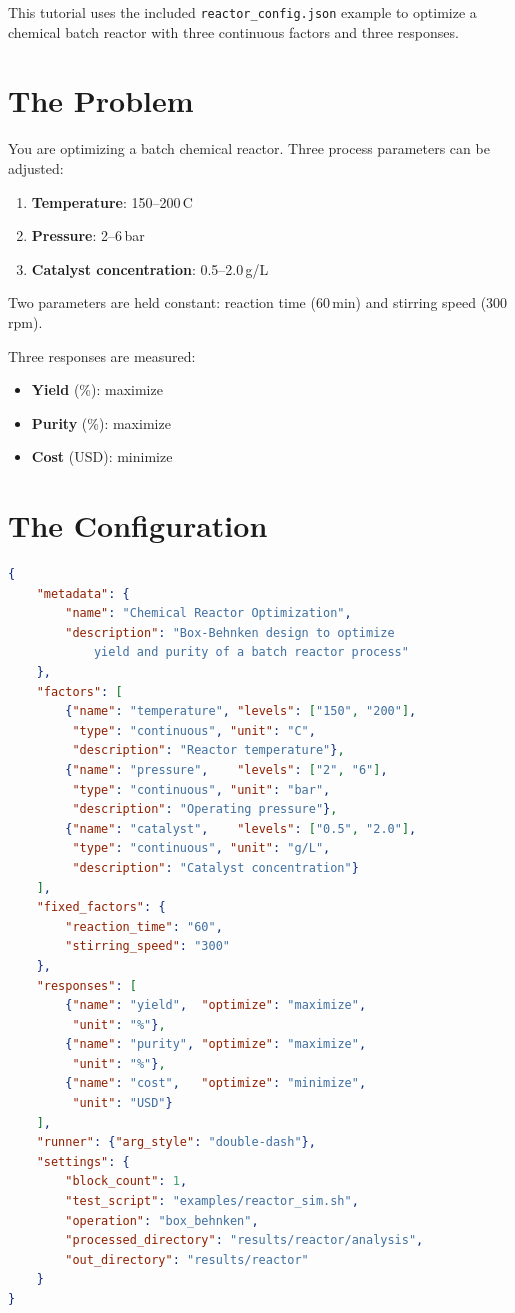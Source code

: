 \documentclass[11pt]{book}
\begin{document}
This tutorial uses the included \texttt{reactor\_config.json} example to optimize a chemical batch reactor with three continuous factors and three responses.

\section{The Problem}

You are optimizing a batch chemical reactor. Three process parameters can be adjusted:

\begin{enumerate}[nosep]
  \item \textbf{Temperature}: 150--200\,\textdegree C
  \item \textbf{Pressure}: 2--6\,bar
  \item \textbf{Catalyst concentration}: 0.5--2.0\,g/L
\end{enumerate}

Two parameters are held constant: reaction time (60\,min) and stirring speed (300\,rpm).

Three responses are measured:
\begin{itemize}[nosep]
  \item \textbf{Yield} (\%): maximize
  \item \textbf{Purity} (\%): maximize
  \item \textbf{Cost} (USD): minimize
\end{itemize}

\section{The Configuration}

\begin{lstlisting}[language=json]
{
    "metadata": {
        "name": "Chemical Reactor Optimization",
        "description": "Box-Behnken design to optimize
            yield and purity of a batch reactor process"
    },
    "factors": [
        {"name": "temperature", "levels": ["150", "200"],
         "type": "continuous", "unit": "C",
         "description": "Reactor temperature"},
        {"name": "pressure",    "levels": ["2", "6"],
         "type": "continuous", "unit": "bar",
         "description": "Operating pressure"},
        {"name": "catalyst",    "levels": ["0.5", "2.0"],
         "type": "continuous", "unit": "g/L",
         "description": "Catalyst concentration"}
    ],
    "fixed_factors": {
        "reaction_time": "60",
        "stirring_speed": "300"
    },
    "responses": [
        {"name": "yield",  "optimize": "maximize",
         "unit": "%"},
        {"name": "purity", "optimize": "maximize",
         "unit": "%"},
        {"name": "cost",   "optimize": "minimize",
         "unit": "USD"}
    ],
    "runner": {"arg_style": "double-dash"},
    "settings": {
        "block_count": 1,
        "test_script": "examples/reactor_sim.sh",
        "operation": "box_behnken",
        "processed_directory": "results/reactor/analysis",
        "out_directory": "results/reactor"
    }
}
\end{lstlisting}
\end{document}
